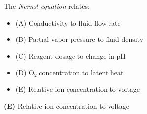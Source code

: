

The {\it Nernst equation} relates:

\begin{itemize}
\item{(A)} Conductivity to fluid flow rate
\vskip 5pt 
\item{(B)} Partial vapor pressure to fluid density
\vskip 5pt 
\item{(C)} Reagent dosage to change in pH
\vskip 5pt 
\item{(D)} O$_{2}$ concentration to latent heat
\vskip 5pt 
\item{(E)} Relative ion concentration to voltage
\end{itemize}







{\bf (E)} Relative ion concentration to voltage 
 









